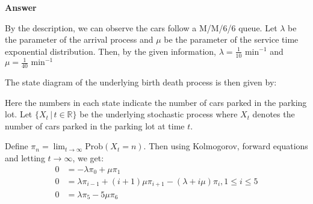 \documentclass[12pt, oneside]{article}
\begin{document}
\begin{enumerate}
{    \textbf{Answer}

    By the description, we can observe the cars follow a M/M/6/6 queue.
    Let \(\lambda\) be the parameter of the arrival process and \(\mu\) be the parameter 
    of the service time exponential distribution. Then, by the given information,
    \(\lambda = \frac{1}{10} \text{ min}^{-1}\) and \(\mu = \frac{1}{40} \text{ min}^{-1}\)
    
    The state diagram of the underlying birth death process is then given by:


    Here the numbers in each state indicate the number of cars parked in the parking lot.
    Let \(\{X_t \,|\, t \in \mathbb{R}\}\) be the underlying stochastic process where \(X_t\)
    denotes the number of cars parked in the parking lot at time \(t\).

    Define \(\pi_n = \lim_{t \to \infty} \text{Prob}(X_t = n)\). Then using Kolmogorov, forward
    equations and letting \(t \to \infty\), we get:
    \begin{align*}
        0 &= -\lambda\pi_0 + \mu\pi_1 \\
        0 &= \lambda \pi_{i-1} + (i+1)\mu \pi_{i+1} - (\lambda + i \mu) \pi_i, 1 \leq i \leq 5 \\
        0 &= \lambda \pi_5 - 5\mu \pi_6 \\
    \end{align*}

}
\end{enumerate}
\end{document}
